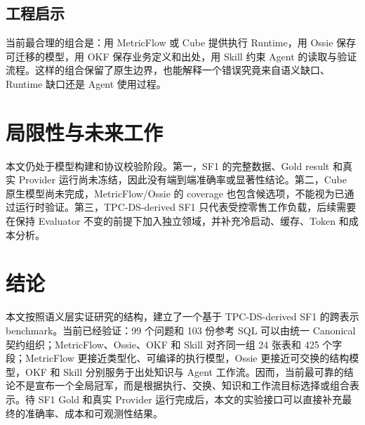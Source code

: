 \documentclass[UTF8,a4paper,12pt]{ctexart}
\begin{document}
\subsection{工程启示}

当前最合理的组合是：用 MetricFlow 或 Cube 提供执行 Runtime，用 Ossie 保存可迁移的模型，用 OKF 保存业务定义和出处，用 Skill 约束 Agent 的读取与验证流程。这样的组合保留了原生边界，也能解释一个错误究竟来自语义缺口、Runtime 缺口还是 Agent 使用过程。

\section{局限性与未来工作}

本文仍处于模型构建和协议校验阶段。第一，SF1 的完整数据、Gold result 和真实 Provider 运行尚未冻结，因此没有端到端准确率或显著性结论。第二，Cube 原生模型尚未完成，MetricFlow/Ossie 的 coverage 也包含候选项，不能视为已通过运行时验证。第三，TPC-DS-derived SF1 只代表受控零售工作负载，后续需要在保持 Evaluator 不变的前提下加入独立领域，并补充冷启动、缓存、Token 和成本分析。

\section{结论}

本文按照语义层实证研究的结构，建立了一个基于 TPC-DS-derived SF1 的跨表示 benchmark。当前已经验证：99 个问题和 103 份参考 SQL 可以由统一 Canonical 契约组织；MetricFlow、Ossie、OKF 和 Skill 对齐同一组 24 张表和 425 个字段；MetricFlow 更接近类型化、可编译的执行模型，Ossie 更接近可交换的结构模型，OKF 和 Skill 分别服务于出处知识与 Agent 工作流。因而，当前最可靠的结论不是宣布一个全局冠军，而是根据执行、交换、知识和工作流目标选择或组合表示。待 SF1 Gold 和真实 Provider 运行完成后，本文的实验接口可以直接补充最终的准确率、成本和可观测性结果。
\end{document}
